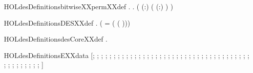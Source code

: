 \newcommand{\HOLdesDate}{23 October 2024}
\newcommand{\HOLdesTime}{10:14}
\begin{SaveVerbatim}{HOLdesDefinitionsbitwiseXXpermXXdef}
\HOLTokenTurnstile{} \HOLSymConst{\HOLTokenForall{}} .
        \HOLSymConst{=}
      .
         ( (:\alpha{}) \HOLSymConst{\ensuremath{-}}  ( (:\beta{}) \HOLSymConst{\ensuremath{-}}  \HOLSymConst{\ensuremath{-}} ) )
\end{SaveVerbatim}
\newcommand{\HOLdesDefinitionsbitwiseXXpermXXdef}{\UseVerbatim{HOLdesDefinitionsbitwiseXXpermXXdef}}
\begin{SaveVerbatim}{HOLdesDefinitionsDESXXdef}
\HOLTokenTurnstile{} \HOLSymConst{\HOLTokenForall{}} .
        \HOLSymConst{=}
     (
         =   
        (  \HOLSymConst{,}  ( )))
\end{SaveVerbatim}
\newcommand{\HOLdesDefinitionsDESXXdef}{\UseVerbatim{HOLdesDefinitionsDESXXdef}}
\begin{SaveVerbatim}{HOLdesDefinitionsdesCoreXXdef}
\HOLTokenTurnstile{} \HOLSymConst{\HOLTokenForall{}} .
        \HOLSymConst{=}  \HOLConst{\HOLTokenCompose}  \HOLConst{\HOLTokenCompose}     \HOLConst{\HOLTokenCompose}  \HOLConst{\HOLTokenCompose} 
\end{SaveVerbatim}
\newcommand{\HOLdesDefinitionsdesCoreXXdef}{\UseVerbatim{HOLdesDefinitionsdesCoreXXdef}}
\begin{SaveVerbatim}{HOLdesDefinitionsEXXdata}
\HOLTokenTurnstile{}  \HOLSymConst{=}
   [; ; ; ; ; ; ; ; ; ; ; ; ; ; ; ; ; ;
    ; ; ; ; ; ; ; ; ; ; ; ; ; ; ;
    ; ; ; ; ; ; ; ; ; ; ; ; ; ; ]
\end{SaveVerbatim}
